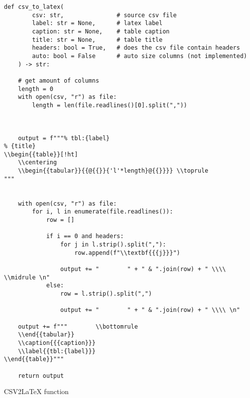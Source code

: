 

\newpage
\begin{listing}[!ht]
    \begin{verbatim}
def csv_to_latex(
        csv: str,               # source csv file
        label: str = None,      # latex label
        caption: str = None,    # table caption
        title: str = None,      # table title
        headers: bool = True,   # does the csv file contain headers
        auto: bool = False      # auto size columns (not implemented)
    ) -> str:
    
    # get amount of columns
    length = 0
    with open(csv, "r") as file:
        length = len(file.readlines()[0].split(","))
    
    
    
    output = f"""% tbl:{label}
% {title}
\\begin{{table}}[!ht]
    \\centering
    \\begin{{tabular}}{{@{{}}{'l'*length}@{{}}}} \\toprule
"""
        
        
    with open(csv, "r") as file:
        for i, l in enumerate(file.readlines()):
            row = []
            
            if i == 0 and headers:
                for j in l.strip().split(","):
                    row.append(f"\\textbf{{{j}}}")
                    
                output += "        " + " & ".join(row) + " \\\\ \\midrule \n"
            else:
                row = l.strip().split(",")
                
                output += "        " + " & ".join(row) + " \\\\ \n"
                
    output += f"""        \\bottomrule
    \\end{{tabular}}
    \\caption{{{caption}}}
    \\label{{tbl:{label}}}
\\end{{table}}"""
    
    return output
    \end{verbatim}
    \caption{CSV2LaTeX function}
    \label{sc:csv2latex-func}
\end{listing}

